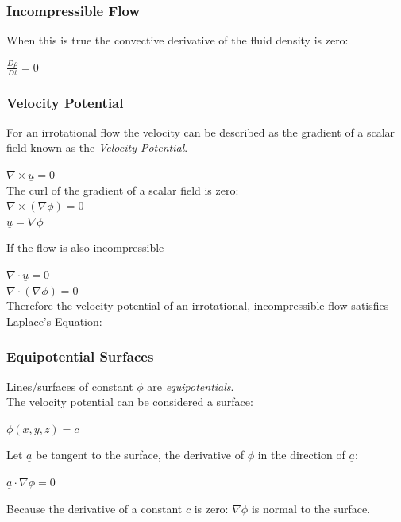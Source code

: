 \subsubsection{Incompressible Flow}
\begin{center}
\end{center}
	When this is true the convective derivative of the fluid density is zero:
	\begin{center}
		$\frac{D\rho}{Dt} = 0$
	\end{center}
\subsubsection{Velocity Potential}
For an irrotational flow the velocity can be described as the gradient of a scalar field known as the \textit{Velocity Potential}.
\begin{center}
	$\nabla \times \underline{u} = 0$
	\\
	The curl of the gradient of a scalar field is zero:
	\\
	$\nabla \times (\nabla \phi) = 0$
	\\
	$\underline{u} = \nabla\phi$
\end{center}
If the flow is also incompressible
\begin{center}
	$\nabla \cdot \underline{u} = 0$
	\\
	$\nabla \cdot (\nabla \phi) = 0$
	\\
	Therefore the velocity potential of an irrotational, incompressible flow satisfies Laplace's Equation:
	\\
\end{center}
\subsubsection{Equipotential Surfaces}
Lines/surfaces of constant $\phi$ are \textit{equipotentials}.
\\
	The velocity potential can be considered a surface:
	\begin{center}
		$\phi(x,y,z)=c$
	\end{center}
	Let $\underline{a}$ be tangent to the surface, the derivative of $\phi$ in the direction of $\underline{a}$:
	\\
	\begin{center}
		$\underline{a}\cdot\nabla \phi = 0$
	\end{center}
	Because the derivative of a constant $c$ is zero: $\nabla \phi$ is normal to the surface.
	\begin{center}
	\end{center}
